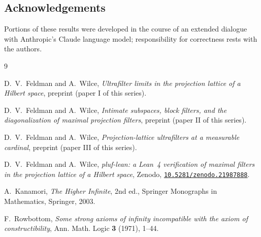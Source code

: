 \documentclass[11pt]{article}
\theoremstyle{definition}
\begin{document}
\subsection*{Acknowledgements}

Portions of these results were developed in the course of an extended
dialogue with Anthropic's Claude language model; responsibility for
correctness rests with the authors.

\begin{thebibliography}{9}

 D.~V.~Feldman and A.~Wilce, \emph{Ultrafilter limits in
the projection lattice of a Hilbert space}, preprint (paper I of this
series).

 D.~V.~Feldman and A.~Wilce, \emph{Intimate subspaces,
block filters, and the diagonalization of maximal projection filters},
preprint (paper II of this series).

 D.~V.~Feldman and A.~Wilce, \emph{Projection-lattice
ultrafilters at a measurable cardinal}, preprint (paper III of this
series).

 D.~V.~Feldman and A.~Wilce, \emph{pluf-lean: a Lean~4 verification of maximal filters in the projection lattice of a Hilbert space}, Zenodo, \href{https://doi.org/10.5281/zenodo.21987888}{\texttt{10.5281/zenodo.21987888}}.

 A.~Kanamori, \emph{The Higher Infinite}, 2nd ed.,
Springer Monographs in Mathematics, Springer, 2003.

 F.~Rowbottom, \emph{Some strong axioms of infinity
incompatible with the axiom of constructibility}, Ann. Math. Logic
\textbf{3} (1971), 1--44.

\end{thebibliography}
\end{document}

